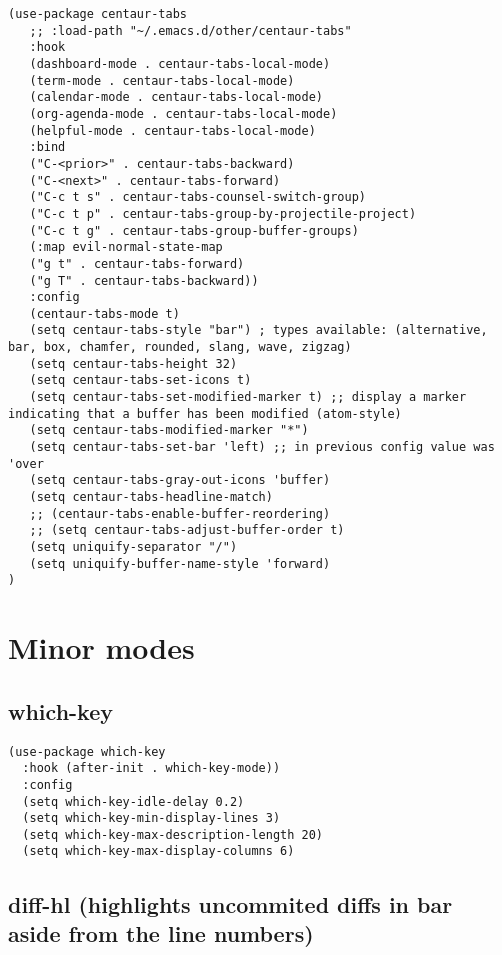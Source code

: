 \documentclass[11pt]{article}
\begin{document}
\begin{verbatim}
(use-package centaur-tabs
   ;; :load-path "~/.emacs.d/other/centaur-tabs"
   :hook
   (dashboard-mode . centaur-tabs-local-mode)
   (term-mode . centaur-tabs-local-mode)
   (calendar-mode . centaur-tabs-local-mode)
   (org-agenda-mode . centaur-tabs-local-mode)
   (helpful-mode . centaur-tabs-local-mode)
   :bind
   ("C-<prior>" . centaur-tabs-backward)
   ("C-<next>" . centaur-tabs-forward)
   ("C-c t s" . centaur-tabs-counsel-switch-group)
   ("C-c t p" . centaur-tabs-group-by-projectile-project)
   ("C-c t g" . centaur-tabs-group-buffer-groups)
   (:map evil-normal-state-map
   ("g t" . centaur-tabs-forward)
   ("g T" . centaur-tabs-backward))
   :config
   (centaur-tabs-mode t)
   (setq centaur-tabs-style "bar") ; types available: (alternative, bar, box, chamfer, rounded, slang, wave, zigzag)
   (setq centaur-tabs-height 32)
   (setq centaur-tabs-set-icons t)
   (setq centaur-tabs-set-modified-marker t) ;; display a marker indicating that a buffer has been modified (atom-style)
   (setq centaur-tabs-modified-marker "*")
   (setq centaur-tabs-set-bar 'left) ;; in previous config value was 'over
   (setq centaur-tabs-gray-out-icons 'buffer)
   (setq centaur-tabs-headline-match)
   ;; (centaur-tabs-enable-buffer-reordering)
   ;; (setq centaur-tabs-adjust-buffer-order t)
   (setq uniquify-separator "/")
   (setq uniquify-buffer-name-style 'forward)
)
\end{verbatim}

\section*{Minor modes}
\label{sec:orgee4e1bb}

\subsection*{which-key}
\label{sec:orgeee1625}

\begin{verbatim}
(use-package which-key
  :hook (after-init . which-key-mode))
  :config
  (setq which-key-idle-delay 0.2)
  (setq which-key-min-display-lines 3)
  (setq which-key-max-description-length 20)
  (setq which-key-max-display-columns 6)
\end{verbatim}

\subsection*{diff-hl (highlights uncommited diffs in bar aside from the line numbers)}
\label{sec:orgbd30b0c}
\end{document}
